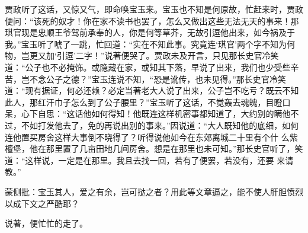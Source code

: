 \begin{parag}


    贾政听了这话，又惊又气，即命唤宝玉来。宝玉也不知是何原故，忙赶来时，贾政便问：“该死的奴才！你在家不读书也罢了，怎么又做出这些无法无天的事来！那琪官现是忠顺王爷驾前承奉的人，你是何等草芥，无故引逗他出来，如今祸及于我。”宝玉听了唬了一跳，忙回道：“实在不知此事。究竟连‘琪官’两个字不知为何物，岂更又加‘引逗’二字！”说著便哭了。贾政未及开言，只见那长史官冷笑道：“公子也不必掩饰。或隐藏在家，或知其下落，早说了出来，我们也少受些辛苦，岂不念公子之德？”宝玉连说不知，“恐是讹传，也未见得。”那长史官冷笑道：“现有据证，何必还赖？必定当著老大人说了出来，公子岂不吃亏？既云不知此人，那红汗巾子怎么到了公子腰里？”宝玉听了这话，不觉轰去魂魄，目瞪口呆，心下自思：“这话他如何得知！他既连这样机密事都知道了，大约别的瞒他不过，不如打发他去了，免的再说出别的事来。”因说道：“大人既知他的底细，如何连他置买房舍这样大事倒不晓得了？听得说他如今在东郊离城二十里有个什 么紫檀堡，他在那里置了几亩田地几间房舍。想是在那里也未可知。”那长史官听了，笑道：“这样说，一定是在那里。我且去找一回，若有了便罢，若没有，还要 来请教。”\begin{note}蒙侧批：宝玉其人，爱之有余，岂可挞之者？用此等文章逼之，能不使人肝胆愤烈以成下文之严酷耶？\end{note}说著，便忙忙的走了。
\end{parag}


